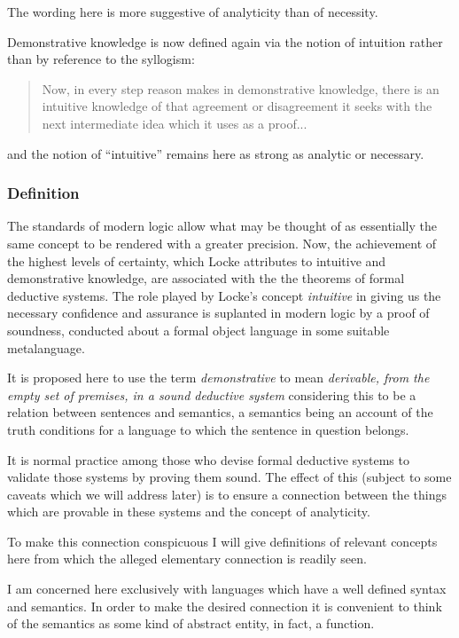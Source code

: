\documentclass[numreferences]{rbjk}
\begin{document}
\begin{article}
The wording here is more suggestive of analyticity than of necessity.

Demonstrative knowledge is now defined again via the notion of intuition rather than by reference to the syllogism:

\begin{quote}
Now, in every step reason makes in demonstrative knowledge, there is an intuitive knowledge of that agreement or disagreement it seeks with the next intermediate idea which it uses as a proof...
\end{quote}

and the notion of ``intuitive'' remains here as strong as analytic or necessary.

\subsubsection{Definition}

The standards of modern logic allow what may be thought of as essentially the same concept to be rendered with a greater precision.
Now, the achievement of the highest levels of certainty, which Locke attributes to intuitive and demonstrative knowledge, are associated with the the theorems of formal deductive systems.
The role played by Locke's concept {\it intuitive} in giving us the necessary confidence and assurance is suplanted in modern logic by a proof of soundness, conducted about a formal object language in some suitable metalanguage.

It is proposed here to use the term {\it demonstrative} to mean {\it derivable, from the empty set of premises, in a sound deductive system} considering this to be a relation between sentences and semantics, a semantics being an account of the truth conditions for a language to which the sentence in question belongs.

It is normal practice among those who devise formal deductive systems to validate those systems by proving them sound.
The effect of this (subject to some caveats which we will address later) is to ensure a connection between the things which are provable in these systems and the concept of analyticity.

To make this connection conspicuous I will give definitions of relevant concepts here from which the alleged elementary connection is readily seen.

I am concerned here exclusively with languages which have a well defined syntax and semantics.
In order to make the desired connection it is convenient to think of the semantics as some kind of abstract entity, in fact, a function.


\end{article}
\end{document}
